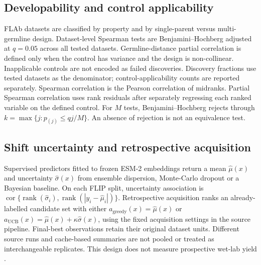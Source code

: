 \subsection{Developability and control applicability}
FLAb datasets are classified by property and by single-parent versus multi-germline design. Dataset-level Spearman tests are Benjamini--Hochberg adjusted at $q=0.05$ across all tested datasets. Germline-distance partial correlation is defined only when the control has variance and the design is non-collinear. Inapplicable controls are not encoded as failed discoveries. Discovery fractions use tested datasets as the denominator; control-applicability counts are reported separately.
Spearman correlation is the Pearson correlation of midranks. Partial Spearman correlation uses rank residuals after separately regressing each ranked variable on the defined control. For $M$ tests, Benjamini--Hochberg rejects through $k=\max\{j:p_{(j)}\le qj/M\}$. An absence of rejection is not an equivalence test.

\subsection{Shift uncertainty and retrospective acquisition}
Supervised predictors fitted to frozen ESM-2 embeddings return a mean $\widehat\mu(x)$ and uncertainty $\widehat\sigma(x)$ from ensemble dispersion, Monte-Carlo dropout or a Bayesian baseline. On each FLIP split, uncertainty association is
$\operatorname{cor}\{\operatorname{rank}(\widehat\sigma_i),\operatorname{rank}(|y_i-\widehat\mu_i|)\}$.
Retrospective acquisition ranks an already-labelled candidate set with either $a_{\mathrm{greedy}}(x)=\widehat\mu(x)$ or $a_{\mathrm{UCB}}(x)=\widehat\mu(x)+\kappa\widehat\sigma(x)$, using the fixed acquisition settings in the source pipeline. Final-best observations retain their original dataset units. Different source runs and cache-based summaries are not pooled or treated as interchangeable replicates. This design does not measure prospective wet-lab yield \citep{Greenman2025UQ}.

